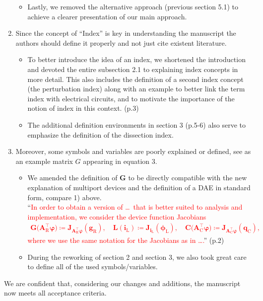 \documentclass[a4paper, 10pt,
    ]{article}
\newcommand{\mb}[1]{\mathbf{#1}}
\newcommand{\mr}[1]{\mathrm{#1}}
\newcommand{\T}{{\!\top}}
\newcommand{\AT}[1]{\mb{A}_\mr{#1}^{\T}}
\newcommand{\qC}{\mb{q}_\mr{C}}
\newcommand{\gR}{\mb{g}_\mr{R}}
\newcommand{\phiL}{\boldsymbol{\phi}_\mr{L}}
\newcommand{\vphi}{\boldsymbol{\varphi}}
\renewcommand{\i}[1]{\mb{i}_\mr{#1}}
\begin{document}
\begin{enumerate}
\begin{itemize}
            \item Lastly, we removed the alternative approach (previous section 5.1) to achieve a clearer presentation of our main approach.
        \end{itemize}

        \item \textcolor{TUDa-0c}{Since the concept of ``Index'' is key in understanding the manuscript the authors should define it properly and not just cite existent literature.}
        \begin{itemize}
            \item To better introduce the idea of an index, we shortened the introduction and devoted the entire subsection 2.1 to explaining index concepts in more detail. This also includes the definition of a second index concept (the perturbation index) along with an example to better link the term index with electrical circuits, and to motivate the importance of the notion of index in this context. (p.3)
            \item The additional definition environments in section 3 (p.5-6) also serve to emphasize the definition of the dissection index.
        \end{itemize}

        \item \textcolor{TUDa-0c}{Moreover, some symbols and variables are poorly explained or defined, see as an example matrix $G$ appearing in equation 3.}
        \begin{itemize}
            \item We amended the definition of $\mb{G}$ to be directly compatible with the new explanation of multiport devices and the definition of a DAE in standard form, compare 1) above.\\
            ``\textcolor{red}{In order to obtain a version of \dots\ that is better suited to analysis and implementation, we consider the device function Jacobians
            \begin{align}
                \mb{G} \big( \AT{R} \vphi \big) \coloneqq \mb{J}_{\AT{R} \vphi}(\gR), \quad \mb{L}(\i{L}) \coloneqq \mb{J}_{\i{L}}(\phiL), \quad \mb{C} \big( \AT{C} \vphi \big) \coloneqq \mb{J}_{\AT{C} \vphi}(\qC),
            \end{align}
            where we use the same notation for the Jacobians as in \dots.}'' (p.2)
            \item During the reworking of section 2 and section 3, we also took great care to define all of the used symbols/variables.
        \end{itemize}
    \end{enumerate}

    We are confident that, considering our changes and additions, the manuscript now meets all acceptance criteria.
\end{document}
